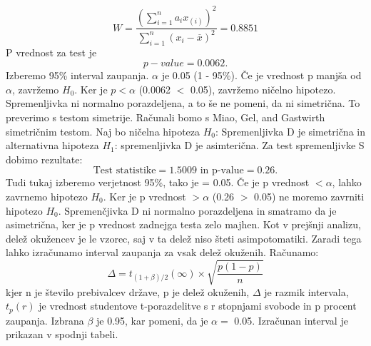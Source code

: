 \documentclass[a4paper,11pt]{article}
\begin{document}
\[W = \frac{(\sum_{i = 1}^{n}a_i x_{(i)})^2}{\sum_{i = 1}^{n}(x_i - \overset{\_}{x})^2} = 0.8851\]
 P vrednost za test je 
\[ p-value = 0.0062. \]
Izberemo 95\% interval zaupanja. \(\alpha\) je 0.05 (1 - 95\%). Če je vrednost p manjša od \(\alpha\), zavržemo \(H_0\). Ker je \(p < \alpha\) (0.0062 \(<\) 0.05), zavržemo ničelno hipotezo. Spremenljivka ni normalno porazdeljena, a to še ne pomeni, da ni simetrična. To preverimo s testom simetrije. Računali bomo s Miao, Gel, and Gastwirth simetričnim testom. Naj bo ničelna hipoteza \(H_0\): Spremenljivka D je simetrična in alternativna hipoteza \(H_1\): spremenljivka D je asimterična. Za test spremenljivke S dobimo rezultate:
\[\text{Test statistike} = 1.5009 \text{ in p-value} =  0.26.\]
Tudi tukaj izberemo verjetnost 95\%, tako je \alpha = 0.05. Če je p vrednost \(< \alpha\), lahko zavrnemo hipotezo \(H_0\). Ker je p vrednost \(> \alpha\) (0.26 \(>\) 0.05) ne moremo zavrniti hipotezo \(H_0\). Spremenčjivka D ni normalno porazdeljena in smatramo da je asimetrična, ker je p vrednost zadnejga testa zelo majhen. Kot v prejšnji analizu, delež okužencev je le vzorec, saj v ta delež niso šteti asimpotomatiki. Zaradi tega lahko izračunamo interval zaupanja za vsak delež okuženih. Računamo:
\[\Delta = t_{(1 + \beta) /2}(\infty) \times \sqrt{\frac{p(1 - p)}{n}}\]
kjer n je število prebivalcev države, p je delež okuženih, \(\Delta\) je razmik intervala, \(t_{p}(r)\) je vrednost studentove t-porazdelitve s r stopnjami svobode in p procent zaupanja. Izbrana \(\beta\) je 0.95, kar pomeni, da je \(\alpha = \) 0.05. Izračunan interval je prikazan v spodnji tabeli. \\
\end{document}

